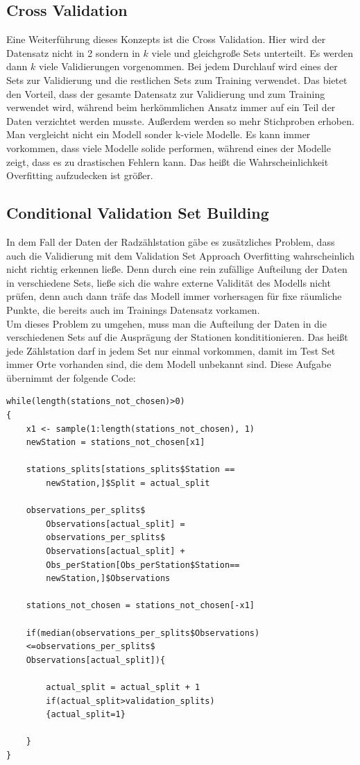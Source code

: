 \documentclass[a4paper,12pt]{thesis}
\begin{document}
\subsection{Cross Validation}

Eine Weiterführung dieses Konzepts ist die Cross Validation. Hier wird der Datensatz nicht in 2 sondern in $k$ viele und gleichgroße Sets unterteilt. Es werden dann $k$ viele Validierungen vorgenommen. Bei jedem Durchlauf wird eines der Sets zur Validierung und die restlichen Sets zum Training verwendet. Das bietet den Vorteil, dass der gesamte Datensatz zur Validierung und zum Training verwendet wird, während beim herkömmlichen Ansatz immer auf ein Teil der Daten verzichtet werden musste. Außerdem werden so mehr Stichproben erhoben. Man vergleicht nicht ein Modell sonder k-viele Modelle. Es kann immer vorkommen, dass viele Modelle solide performen, während eines der Modelle zeigt, dass es zu drastischen Fehlern kann. Das heißt die Wahrscheinlichkeit Overfitting aufzudecken ist größer.

\subsection{Conditional Validation Set Building}

In dem Fall der Daten der Radzählstation gäbe es zusätzliches Problem, dass auch die Validierung mit dem Validation Set Approach Overfitting wahrscheinlich nicht richtig erkennen ließe. Denn durch eine rein zufällige Aufteilung der Daten in verschiedene Sets, ließe sich die wahre externe Validität des Modells nicht prüfen, denn auch dann träfe das Modell immer vorhersagen für fixe räumliche Punkte, die bereits auch im Trainings Datensatz vorkamen.\\
Um dieses Problem zu umgehen, muss man die Aufteilung der Daten in die verschiedenen Sets auf die Ausprägung der Stationen kondititionieren. Das heißt jede Zählstation darf in jedem Set nur einmal vorkommen, damit im Test Set immer Orte vorhanden sind, die dem Modell unbekannt sind. Diese Aufgabe übernimmt der folgende Code:

\begin{lstlisting}[caption={Aufteilung der Zählstationen},label=code:valSetBui]
while(length(stations_not_chosen)>0)
{
	x1 <- sample(1:length(stations_not_chosen), 1)
	newStation = stations_not_chosen[x1]
	
	stations_splits[stations_splits$Station == 
		newStation,]$Split = actual_split
	
	observations_per_splits$
		Observations[actual_split] = 				
		observations_per_splits$
		Observations[actual_split] + 
		Obs_perStation[Obs_perStation$Station== 
		newStation,]$Observations
	
	stations_not_chosen = stations_not_chosen[-x1]
	
	if(median(observations_per_splits$Observations)
	<=observations_per_splits$
	Observations[actual_split]){
		
		actual_split = actual_split + 1
		if(actual_split>validation_splits)
		{actual_split=1}
		
	}
}
\end{lstlisting}
\end{document}
